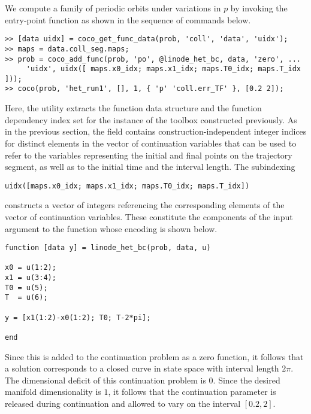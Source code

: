 We compute a family of periodic orbits under variations in $p$ by invoking the  entry-point function as shown in the sequence of commands below.
\begin{lstlisting}[language=coco-highlight]
>> [data uidx] = coco_get_func_data(prob, 'coll', 'data', 'uidx');
>> maps = data.coll_seg.maps;
>> prob = coco_add_func(prob, 'po', @linode_het_bc, data, 'zero', ...
     'uidx', uidx([ maps.x0_idx; maps.x1_idx; maps.T0_idx; maps.T_idx ]));
>> coco(prob, 'het_run1', [], 1, { 'p' 'coll.err_TF' }, [0.2 2]);
\end{lstlisting}
Here, the  utility extracts the function data structure and the function dependency index set for the instance of the  toolbox constructed previously. As in the previous section, the  field contains construction-independent integer indices for distinct elements in the vector of continuation variables that  can be used to refer to the variables representing the initial and final points on the trajectory segment, as well as to the initial time and the interval length. The subindexing
\begin{lstlisting}[language=coco-highlight]
uidx([maps.x0_idx; maps.x1_idx; maps.T0_idx; maps.T_idx])
\end{lstlisting}
constructs a vector of integers referencing the corresponding elements of the vector of continuation variables. These constitute the components of the  input argument to the function  whose encoding is shown below.
\begin{lstlisting}[language=coco-highlight]
function [data y] = linode_het_bc(prob, data, u)

x0 = u(1:2);
x1 = u(3:4);
T0 = u(5);
T  = u(6);

y = [x1(1:2)-x0(1:2); T0; T-2*pi];

end
\end{lstlisting}
Since this is added to the continuation problem as a zero function, it follows that a solution corresponds to a closed curve in state space with interval length $2\pi$. The dimensional deficit of this continuation problem is $0$. Since the desired manifold dimensionality is $1$, it follows that the continuation parameter  is released during continuation and allowed to vary on the interval $[0.2,2]$.

